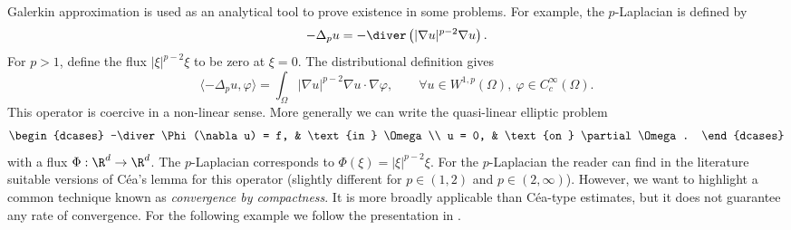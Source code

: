 Galerkin approximation is used as an analytical tool to prove existence in some problems. For example, the $p$-Laplacian is defined by
\begin{equation*}
    -\Delta_p u = - \diver \left( |\nabla u|^{p-2} \nabla u \right).
\end{equation*}
For $p>1$, define the flux $|\xi|^{p-2}\xi$ to be zero at $\xi=0$. The distributional definition gives
\begin{equation*}
    \langle-\Delta_p u,\varphi\rangle = \int_\Omega |\nabla u|^{p-2} \nabla u \cdot \nabla \varphi, \qquad \forall u\in W^{1,p}(\Omega),\ \varphi\in C_c^\infty(\Omega).
\end{equation*}
This operator is coercive in a non-linear sense.
More generally we can write the quasi-linear elliptic problem
\begin{equation}
    \label{eq:cuasilinear}
    \begin{dcases}
        -\diver \Phi(\nabla u) = f, & \text{in } \Omega           \\
        u = 0,                      & \text{on } \partial \Omega.
    \end{dcases}
\end{equation}
with a flux $\Phi : \R^d \to \R^d$. The $p$-Laplacian corresponds to $\Phi(\xi) = |\xi|^{p-2}\xi$.
For the $p$-Laplacian the reader can find in the literature suitable versions of Céa's lemma for this operator (slightly different for $p \in (1,2)$ and $p\in(2,\infty)$).
However, we want to highlight a common technique known as \emph{convergence by compactness}.
It is more broadly applicable than Céa-type estimates, but it does not guarantee any rate of convergence.
For the following example we follow the presentation in \cite[Section 9.14]{Ciarlet2013}.
